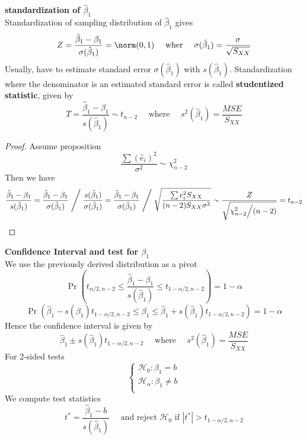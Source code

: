 \documentclass[11pt]{article}
\begin{document}
\begin{defn*}
    \textbf{standardization of $\hat{\beta}_1$} \\
    Standardization of sampling distribution of $\hat{\beta}_1$ gives 
    \[
        Z =  \frac{\hat{\beta}_1 - \beta_1}{\sigma(\hat{\beta}_1)} = \norm(0, 1) \quad \text{ wher } \quad \sigma(\hat{\beta}_1) = \frac{\sigma}{\sqrt{S_{XX}}}
    \]
    Usually, have to estimate standard error $\sigma(\hat{\beta}_1)$ with $s(\hat{\beta}_1)$. Standardization where the denominator is an estimated standard error is called \textbf{studentized statistic}, given by
    \[
        T = \frac{\hat{\beta}_1 - \beta_1}{s(\hat{\beta}_1)} \sim t_{n-2} \quad  \text{ where } \quad s^2(\hat{\beta}_1) = \frac{MSE}{S_{XX}}
    \]
    \begin{proof}
        Assume proposition 
        \[
            \frac{\sum (\hat{e}_i)^2 }{\sigma^2} \sim \chi^2_{n-2}
        \]
        Then we have 
        \[
            \frac{\hat{\beta}_1 - \beta_1}{s(\hat{\beta}_1)} 
            = \frac{\hat{\beta}_1 - \beta_1}{\sigma(\hat{\beta}_1)} \Biggm/ \frac{s(\hat{\beta}_1)}{\sigma(\hat{\beta}_1)} 
            = \frac{\hat{\beta}_1 - \beta_1}{\sigma(\hat{\beta}_1)} \Biggm/ \sqrt{\frac{\sum e_i^2 S_{XX}}{(n-2) S_{XX} \sigma^2 }}
            \sim \frac{Z}{\sqrt{\chi^2_{n-2} \Big/ (n-2)}} 
            = t_{n-2}
        \]
    \end{proof}
\end{defn*}


\begin{defn*}
    \textbf{Confidence Interval and test for $\beta_1$} \\
    We use the previously derived distribution as a pivot
    \[
        \Pr\left(t_{\alpha/2, n-2} \leq \frac{\hat{\beta}_1 - \beta_1}{s(\hat{\beta}_1)} \leq t_{1-\alpha/2, n-2}\right) = 1-\alpha
    \]
    \[
        \Pr\left(\hat{\beta}_1 - s(\hat{\beta}_1)t_{1-\alpha/2, n-2} \leq \beta_1 \leq \hat{\beta}_1 + s(\hat{\beta}_1)t_{1-\alpha/2, n-2} \right) = 1-\alpha
    \]
    Hence the confidence interval is given by 
    \[
        \hat{\beta}_1 \pm s(\hat{\beta}_1)t_{1-\alpha/2, n-2} \quad \text{ where }\quad s^2(\hat{\beta}_1) = \frac{MSE}{S_{XX}}
    \]
    For 2-sided tests
    \[
        \begin{cases*}
            \mathcal{H}_0: \beta_1 = b\\
            \mathcal{H}_{\alpha}: \beta_1 \neq b\\  
        \end{cases*}
    \]
    We compute test statistics 
    \[
        t^* = \frac{\hat{\beta}_1 - b}{s(\hat{\beta}_1)} \quad \text{ and reject $\mathcal{H}_0$ if }  |t^*| > t_{1-\alpha/2, n-2}
    \]
\end{defn*}
\end{document}
